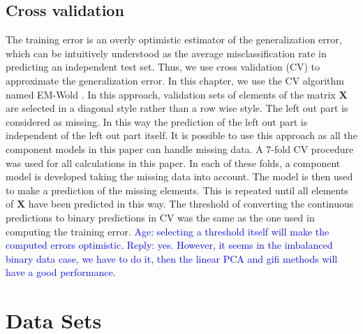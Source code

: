\subsection{Cross validation}
The training error is an overly optimistic estimator of the generalization error, which can be intuitively understood as the average misclassification rate in predicting an independent test set. Thus, we use cross validation (CV) to approximate the generalization error. In this chapter, we use the CV algorithm named EM-Wold \cite{wold1978cross,Bro2008}. In this approach, validation sets of elements of the matrix $\mathbf{X}$ are selected in a diagonal style rather than a row wise style. The left out part is considered as missing. In this way the prediction of the left out part is independent of the left out part itself. It is possible to use this approach as all the component models in this paper can handle missing data. A 7-fold CV procedure was used for all calculations in this paper. In each of these folds, a component model is developed taking the missing data into account. The model is then used to make a prediction of the missing elements. This is repeated until all elements of $\mathbf{X}$ have been predicted in this way. The threshold of converting the continuous predictions to binary predictions in CV was the same as the one used in computing the training error. \textcolor{blue}{Age: selecting a threshold itself will make the computed errors optimistic. Reply: yes. However, it seems in the imbalanced binary data case, we have to do it, then the linear PCA and gifi methods will have a good performance.}

\section{Data Sets}

